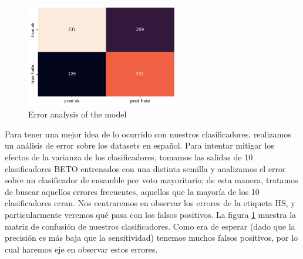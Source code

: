 
\begin{figure}[t]
    \centering
    \includegraphics[width=0.6\textwidth]{img/hateval_confusion_matrix.pdf}
    \caption{Error analysis of the model}
    \label{fig:hateval_error_analysis}
\end{figure}


Para tener una mejor idea de lo ocurrido con nuestros clasificadores, realizamos un análisis de error sobre los datasets en español. Para intentar mitigar los efectos de la varianza de los clasificadores, tomamos las salidas de 10 clasificadores BETO entrenados con una distinta semilla y analizamos el error sobre un clasificador de ensamble por voto mayoritario; de esta manera, tratamos de buscar aquellos errores frecuentes, aquellos que la mayoría de los 10 clasificadores erran. Nos centraremos en observar los errores de la etiqueta HS, y particularmente veremos qué pasa con los falsos positivos. La figura \ref{fig:hateval_error_analysis} muestra la matriz de confusión de nuestros clasificadores. Como era de esperar (dado que la precisión es más baja que la sensitividad) tenemos muchos falsos positivos, por lo cual haremos eje en observar estos errores.


